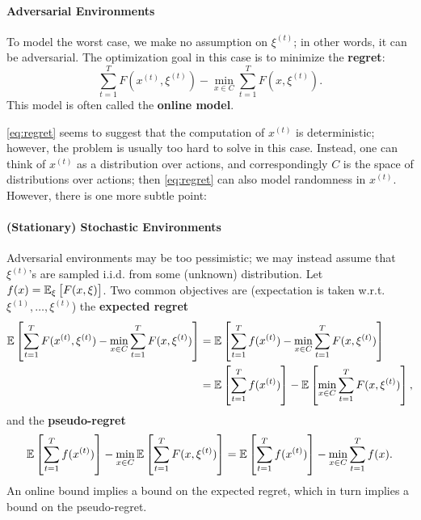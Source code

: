 \documentclass[openany]{book}
\theoremstyle{definition}
\theoremstyle{remark}
\begin{document}
\paragraph{Adversarial Environments}
To model the worst case, we make no assumption on $\xi^{(t)}$; in other words, it can be adversarial. The optimization goal in this case is to minimize the \textbf{regret}:
\begin{equation}\label{eq:regret}
    \sum_{t=1}^{T}F(x^{(t)},\xi^{(t)})-\min_{x\in C}\sum_{t=1}^{T}F(x,\xi^{(t)}).
\end{equation}
This model is often called the \textbf{online model}.

\eqref{eq:regret} seems to suggest that the computation of $x^{(t)}$ is deterministic; however, the problem is usually too hard to solve in this case. Instead, one can think of $x^{(t)}$ as a distribution over actions, and correspondingly $C$ is the space of distributions over actions; then \eqref{eq:regret} can also model randomness in $x^{(t)}$. However, there is one more subtle point:

\paragraph{(Stationary) Stochastic Environments}
Adversarial environments may be too pessimistic; we may instead assume that $\xi^{(t)}$'s are sampled i.i.d. from some (unknown) distribution. Let $f(x)=\mathbb{E}_{\xi}\sbr{F(x,\xi)}$. Two common objectives are (expectation is taken w.r.t. $\xi^{(1)},\ldots,\xi^{(t)}$) the \textbf{expected regret}
\begin{equation}\label{eq:expectRegret}
    \begin{split}
        \mathbb{E}\sbr{\sum_{t=1}^{T}F(x^{(t)},\xi^{(t)})-\min_{x\in C}\sum_{t=1}^{T}F(x,\xi^{(t)})} & = \mathbb{E}\sbr{\sum_{t=1}^{T}f(x^{(t)})-\min_{x\in C}\sum_{t=1}^{T}F(x,\xi^{(t)})} \\
         & =\mathbb{E}\sbr{\sum_{t=1}^{T}f(x^{(t)})}-\mathbb{E}\sbr{\min_{x\in C}\sum_{t=1}^{T}F(x,\xi^{(t)})},
    \end{split}
\end{equation}
and the \textbf{pseudo-regret}
\begin{equation}\label{eq:pseudoRegret}
    \mathbb{E}\sbr{\sum_{t=1}^{T}f(x^{(t)})}-\min_{x\in C}\mathbb{E}\sbr{\sum_{t=1}^{T}F(x,\xi^{(t)})}=\mathbb{E}\sbr{\sum_{t=1}^{T}f(x^{(t)})}-\min_{x\in C}\sum_{t=1}^{T}f(x).
\end{equation}
An online bound implies a bound on the expected regret, which in turn implies a bound on the pseudo-regret.
\end{document}

